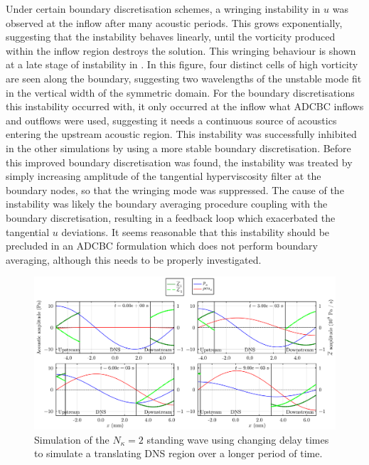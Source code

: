 Under certain boundary discretisation schemes, a wringing instability in $u$ was observed at the inflow after many acoustic periods. This grows exponentially, suggesting that the instability behaves linearly, until the vorticity produced within the inflow region destroys the solution. This wringing behaviour is shown at a late stage of instability in . In this figure, four distinct cells of high vorticity are seen along the boundary, suggesting two wavelengths of the unstable mode fit in the vertical width of the symmetric domain. For the boundary discretisations this instability occurred with, it only occurred at the inflow what ADCBC inflows and outflows were used, suggesting it needs a continuous source of acoustics entering the upstream acoustic region. This instability was successfully inhibited in the other simulations by using a more stable boundary discretisation. Before this improved boundary discretisation was found, the instability was treated by simply increasing amplitude of the tangential hyperviscosity filter at the boundary nodes, so that the wringing mode was suppressed. The cause of the instability was likely the boundary averaging procedure coupling with the boundary discretisation, resulting in a feedback loop which exacerbated the tangential $u$ deviations. It seems reasonable that this instability should be precluded in an ADCBC formulation which does not perform boundary averaging, although this needs to be properly investigated.

\begin{figure}[t]
\centering
\includegraphics[scale=0.30]{assets/graphs/ac-plot-3-4_moving.pdf}
\caption{Simulation of the $N_κ = 2$ standing wave using changing delay times to simulate a translating DNS region over a longer period of time.}
\label{fig:moving-dns-region}
\end{figure}

